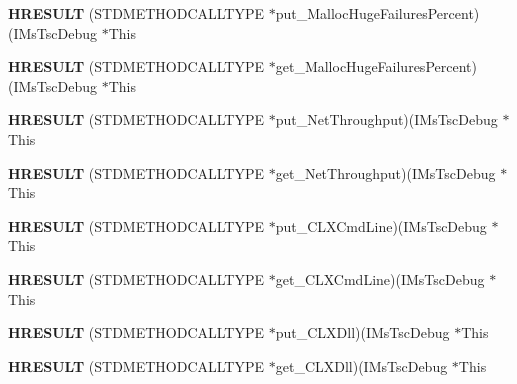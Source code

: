 \begin{DoxyCompactItemize}
{\bfseries H\+R\+E\+S\+U\+LT} (S\+T\+D\+M\+E\+T\+H\+O\+D\+C\+A\+L\+L\+T\+Y\+PE $\ast$put\+\_\+\+Malloc\+Huge\+Failures\+Percent)(I\+Ms\+Tsc\+Debug $\ast$This
\item 
\mbox{\label{struct_i_ms_tsc_debug_vtbl_aa5a5f9861d389c205b8521ae66decb2f}} 
{\bfseries H\+R\+E\+S\+U\+LT} (S\+T\+D\+M\+E\+T\+H\+O\+D\+C\+A\+L\+L\+T\+Y\+PE $\ast$get\+\_\+\+Malloc\+Huge\+Failures\+Percent)(I\+Ms\+Tsc\+Debug $\ast$This
\item 
\mbox{\label{struct_i_ms_tsc_debug_vtbl_aae1e9e7abb9a001f8970ddb0876b3c29}} 
{\bfseries H\+R\+E\+S\+U\+LT} (S\+T\+D\+M\+E\+T\+H\+O\+D\+C\+A\+L\+L\+T\+Y\+PE $\ast$put\+\_\+\+Net\+Throughput)(I\+Ms\+Tsc\+Debug $\ast$This
\item 
\mbox{\label{struct_i_ms_tsc_debug_vtbl_a3cc36dbff3ae2768ca2eff60fd79609d}} 
{\bfseries H\+R\+E\+S\+U\+LT} (S\+T\+D\+M\+E\+T\+H\+O\+D\+C\+A\+L\+L\+T\+Y\+PE $\ast$get\+\_\+\+Net\+Throughput)(I\+Ms\+Tsc\+Debug $\ast$This
\item 
\mbox{\label{struct_i_ms_tsc_debug_vtbl_a1f1c5ff2b696ab60de8d7e5e408a008e}} 
{\bfseries H\+R\+E\+S\+U\+LT} (S\+T\+D\+M\+E\+T\+H\+O\+D\+C\+A\+L\+L\+T\+Y\+PE $\ast$put\+\_\+\+C\+L\+X\+Cmd\+Line)(I\+Ms\+Tsc\+Debug $\ast$This
\item 
\mbox{\label{struct_i_ms_tsc_debug_vtbl_aafb9ebccfc1eddf1eeffa56200af305d}} 
{\bfseries H\+R\+E\+S\+U\+LT} (S\+T\+D\+M\+E\+T\+H\+O\+D\+C\+A\+L\+L\+T\+Y\+PE $\ast$get\+\_\+\+C\+L\+X\+Cmd\+Line)(I\+Ms\+Tsc\+Debug $\ast$This
\item 
\mbox{\label{struct_i_ms_tsc_debug_vtbl_a91069bae5f39b0be5029ca2481bad3c2}} 
{\bfseries H\+R\+E\+S\+U\+LT} (S\+T\+D\+M\+E\+T\+H\+O\+D\+C\+A\+L\+L\+T\+Y\+PE $\ast$put\+\_\+\+C\+L\+X\+Dll)(I\+Ms\+Tsc\+Debug $\ast$This
\item 
\mbox{\label{struct_i_ms_tsc_debug_vtbl_acf0b18882398f77db5a73be2f3948d46}} 
{\bfseries H\+R\+E\+S\+U\+LT} (S\+T\+D\+M\+E\+T\+H\+O\+D\+C\+A\+L\+L\+T\+Y\+PE $\ast$get\+\_\+\+C\+L\+X\+Dll)(I\+Ms\+Tsc\+Debug $\ast$This
\item 

\end{DoxyCompactItemize}
